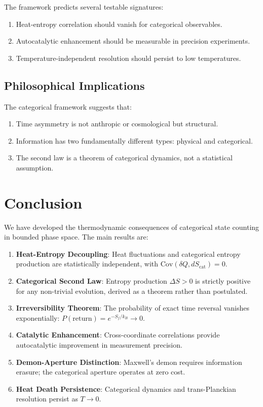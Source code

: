 The framework predicts several testable signatures:

\begin{enumerate}
    \item Heat-entropy correlation should vanish for categorical observables.
    \item Autocatalytic enhancement should be measurable in precision experiments.
    \item Temperature-independent resolution should persist to low temperatures.
\end{enumerate}

\subsection{Philosophical Implications}

The categorical framework suggests that:

\begin{enumerate}
    \item Time asymmetry is not anthropic or cosmological but structural.
    \item Information has two fundamentally different types: physical and categorical.
    \item The second law is a theorem of categorical dynamics, not a statistical assumption.
\end{enumerate}

\section{Conclusion}

We have developed the thermodynamic consequences of categorical state counting in bounded phase space. The main results are:

\begin{enumerate}
    \item \textbf{Heat-Entropy Decoupling}: Heat fluctuations and categorical entropy production are statistically independent, with $\text{Cov}(\delta Q, dS_{\text{cat}}) = 0$.

    \item \textbf{Categorical Second Law}: Entropy production $\Delta S > 0$ is strictly positive for any non-trivial evolution, derived as a theorem rather than postulated.

    \item \textbf{Irreversibility Theorem}: The probability of exact time reversal vanishes exponentially: $P(\text{return}) = e^{-S_f/k_B} \to 0$.

    \item \textbf{Catalytic Enhancement}: Cross-coordinate correlations provide autocatalytic improvement in measurement precision.

    \item \textbf{Demon-Aperture Distinction}: Maxwell's demon requires information erasure; the categorical aperture operates at zero cost.

    \item \textbf{Heat Death Persistence}: Categorical dynamics and trans-Planckian resolution persist as $T \to 0$.
\end{enumerate}


